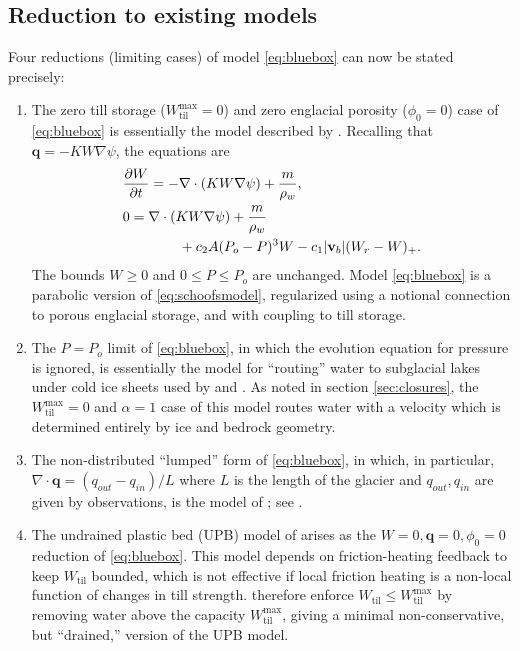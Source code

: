 \documentclass[gmd]{copernicus}   %
\begin{document}
\subsection{Reduction to existing models}  Four reductions (limiting cases) of model \eqref{eq:bluebox} can now be stated precisely:

\renewcommand{\labelenumi}{\textbf{(\roman{enumi})}}
\begin{enumerate}
\item The zero till storage ($W_{\text{til}}^{\text{max}}=0$) and zero englacial porosity ($\phi_0=0$) case of \eqref{eq:bluebox} is essentially the model described by \cite{Schoofetal2012}.  Recalling that $\mathbf{q} = - K W \nabla \psi$, the equations are
\begin{align}
&\frac{\partial W}{\partial t} = - \nabla\cdot\left( K W \nabla \psi \right) + \frac{m}{\rho_w}, \label{eq:schoofsmodel} \\
&0 = \nabla\cdot \left( K W \nabla \psi \right) + \frac{m}{\rho_w} \notag \\
&\qquad \qquad + c_2 A (P_o - P)^3 W - c_1 |\mathbf{v}_b| (W_r - W)_+.  \notag
\end{align}
The bounds $W \ge 0$ and $0 \le P \le P_o$ are unchanged.  Model \eqref{eq:bluebox} is a parabolic version of \eqref{eq:schoofsmodel}, regularized using a notional connection to porous englacial storage, and with coupling to till storage.

\item The $P=P_o$ limit of \eqref{eq:bluebox}, in which the evolution equation for pressure is ignored, is essentially the model for ``routing'' water to subglacial lakes under cold ice sheets used by \cite{Siegertetal2009} and \cite{Livingstoneetal2013}.  As noted in section \ref{sec:closures}, the $W_{\text{til}}^{\text{max}}=0$ and $\alpha=1$ case of this model routes water with a velocity which is determined entirely by ice and bedrock geometry.

\item The non-distributed ``lumped'' form of \eqref{eq:bluebox}, in which, in particular, $\nabla\cdot \mathbf{q} = (q_{out} - q_{in})/L$ where $L$ is the length of the glacier and $q_{out},q_{in}$ are given by observations, is the model of \cite{Bartholomausetal2011}; see \cite{Bueler2014correspondence}.

\item The undrained plastic bed (UPB) model of \cite{Tulaczyketal2000b} arises as the $W=0,\mathbf{q}=0,\phi_0=0$ reduction of \eqref{eq:bluebox}.  This model depends on friction-heating feedback to keep $W_{\text{til}}$ bounded, which is not effective if local friction heating is a non-local function of changes in till strength.  \cite{BBssasliding} therefore enforce $W_{\text{til}} \le W_{\text{til}}^{\text{max}}$ by removing water above the capacity $W_{\text{til}}^{\text{max}}$, giving a minimal non-conservative, but ``drained,'' version of the UPB model.
\end{enumerate}
\end{document}
